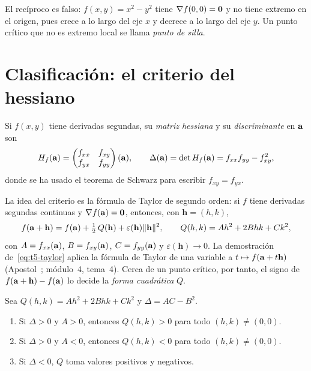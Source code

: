 El recíproco es falso: $f(x,y)=x^2-y^2$ tiene $\nabla f(0,0)=\mathbf{0}$ y no tiene extremo en el origen, pues crece a lo largo del eje $x$ y decrece a lo largo del eje $y$. Un punto crítico que no es extremo local se llama \emph{punto de silla}.

\section{Clasificación: el criterio del hessiano}

\begin{definicion}\label{def:hessiana}
Si $f(x,y)$ tiene derivadas segundas, su \emph{matriz hessiana} y su \emph{discriminante} en $\mathbf{a}$ son
\[
H_f(\mathbf{a})=\begin{pmatrix}f_{xx}&f_{xy}\\f_{yx}&f_{yy}\end{pmatrix}(\mathbf{a}),\qquad
\Delta(\mathbf{a})=\det H_f(\mathbf{a})=f_{xx}f_{yy}-f_{xy}^2 ,
\]
donde se ha usado el teorema de Schwarz para escribir $f_{xy}=f_{yx}$.
\end{definicion}

La idea del criterio es la fórmula de Taylor de segundo orden: si $f$ tiene derivadas segundas continuas y $\nabla f(\mathbf{a})=\mathbf{0}$, entonces, con $\mathbf h=(h,k)$,
\begin{equation}\label{eq:t5-taylor}
f(\mathbf{a}+\mathbf h)=f(\mathbf{a})+\tfrac12\,Q(\mathbf h)+\varepsilon(\mathbf h)\lVert\mathbf h\rVert^2,\qquad Q(h,k)=Ah^2+2Bhk+Ck^2,
\end{equation}
con $A=f_{xx}(\mathbf{a})$, $B=f_{xy}(\mathbf{a})$, $C=f_{yy}(\mathbf{a})$ y $\varepsilon(\mathbf h)\to0$. La demostración de~\eqref{eq:t5-taylor} aplica la fórmula de Taylor de una variable a $t\mapsto f(\mathbf{a}+t\mathbf h)$ (Apostol~\cite[§9.9--9.12]{apostol2}; módulo~4, tema~4). Cerca de un punto crítico, por tanto, el signo de $f(\mathbf{a}+\mathbf h)-f(\mathbf{a})$ lo decide la \emph{forma cuadrática} $Q$.

\begin{lema}\label{lem:forma}
Sea $Q(h,k)=Ah^2+2Bhk+Ck^2$ y $\Delta=AC-B^2$.
\begin{enumerate}
  \item Si $\Delta>0$ y $A>0$, entonces $Q(h,k)>0$ para todo $(h,k)\neq(0,0)$.
  \item Si $\Delta>0$ y $A<0$, entonces $Q(h,k)<0$ para todo $(h,k)\neq(0,0)$.
  \item Si $\Delta<0$, $Q$ toma valores positivos y negativos.
\end{enumerate}
\end{lema}


